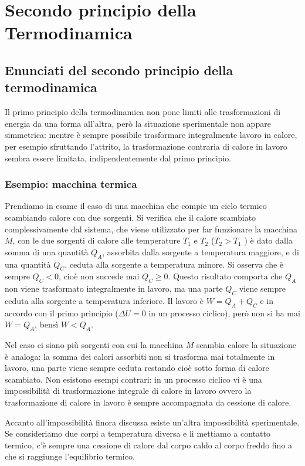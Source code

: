 \documentclass[class=book, crop=false, oneside, 12pt]{standalone}
\begin{document}
\chapter{Secondo principio della Termodinamica}

\section{Enunciati del secondo principio della termodinamica}

Il primo principio della termodinamica non pone limiti alle trasformazioni di energia da una forma all'altra, però la situazione sperimentale non appare simmetrica: mentre è sempre possibile trasformare integralmente lavoro in calore, per esempio sfruttando l'attrito, la trasformazione contraria di calore in lavoro sembra essere limitata, indipendentemente dal primo principio.

\subsection{Esempio: macchina termica}

Prendiamo in esame il caso di una macchina che compie un ciclo termico scambiando calore con due sorgenti. 
Si verifica che il calore scambiato complessivamente dal sistema, che viene utilizzato per far funzionare la macchina \(M\), con le due sorgenti di calore alle temperature \(T_1\) e \(T_2\) (\(T_2 > T_1\) ) è dato dalla somma di una quantità \(Q_A\), assorbita dalla sorgente a temperatura maggiore, e di una quantità \(Q_C\), ceduta alla sorgente a temperatura minore. 
Si osserva che è sempre \(Q_C<0\), cioè non succede mai \(Q_C \geq 0\). 
Questo risultato comporta che \(Q_A\) non viene trasformato integralmente in lavoro, ma una parte \(Q_C\) viene sempre ceduta alla sorgente a temperatura inferiore. 
Il lavoro è \(W = Q_A + Q_C\) e in accordo con il primo principio (\(\Delta U = 0\) in un processo ciclico), però non si ha mai \(W = Q_A\), bensì \(W < Q_A\). 

Nel caso ci siano più sorgenti con cui la macchina \(M\) scambia calore la situazione è analoga: la somma dei calori assorbiti non si trasforma mai totalmente in lavoro, una parte viene sempre ceduta restando cioè sotto forma di calore scambiato. 
Non esistono esempi contrari: in un processo ciclico vi è una impossibilità di trasformazione integrale di calore in lavoro ovvero la trasformazione di calore in lavoro è sempre accompagnata da cessione di calore. 

Accanto all'impossibilità finora discussa esiste un'altra impossibilità sperimentale. 
Se consideriamo due corpi a temperatura diversa e li mettiamo a contatto termico, c'è sempre una cessione di calore dal corpo caldo al corpo freddo fino a che si raggiunge l'equilibrio termico. 
\end{document}
